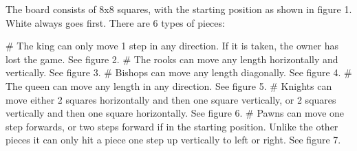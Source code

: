 \documentclass{article}
\begin{document}
The board consists of 8x8 squares, with the starting position as shown in figure 1. White always goes first. There are 6 types of pieces:
\begin{easylist}[itemize]
    # The king can only move 1 step in any direction. If it is taken, the owner has lost the game. See figure 2.
    # The rooks can move any length horizontally and vertically. See figure 3.
    # Bishops can move any length diagonally. See figure 4.
    # The queen can move any length in any direction. See figure 5.
    # Knights can move either 2 squares horizontally and then one square vertically, or 2 squares vertically and then one square horizontally. See figure 6.
    # Pawns can move one step forwards, or two steps forward if in the starting position. Unlike the other pieces it can only hit a piece one step up vertically to left or right. See figure 7.
\end{easylist}
\end{document}
